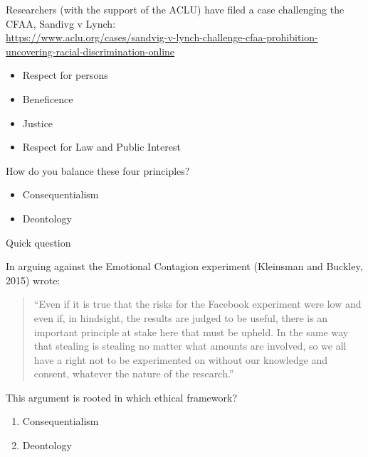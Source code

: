 \documentclass{beamer}
\def\vf{\vfill}
\begin{document}
\begin{frame}

Researchers (with the support of the ACLU) have filed a case challenging the CFAA, Sandivg v Lynch:\\
\tiny{\textcolor{blue}{\url{https://www.aclu.org/cases/sandvig-v-lynch-challenge-cfaa-prohibition-uncovering-racial-discrimination-online}}}

\end{frame}
\begin{frame}

\begin{itemize}
\item Respect for persons
\item Beneficence
\item Justice
\item Respect for Law and Public Interest
\end{itemize}

\vf
How do you balance these four principles?

\end{frame}
\begin{frame}

\begin{itemize}
\item Consequentialism
\item Deontology
\end{itemize}

\end{frame}
\begin{frame} {Quick question}

In arguing against the Emotional Contagion experiment (Kleinsman and Buckley, 2015) wrote:
\begin{quote}
``Even if it is true that the risks for the Facebook experiment were low and even if, in hindsight, the results are judged to be useful, there is an important principle at stake here that must be upheld.  In the same way that stealing is stealing no matter what amounts are involved, so we all have a right not to be experimented on without our knowledge and consent, whatever the nature of the research.'' 
\end{quote}
This argument is rooted in which ethical framework?
\begin{enumerate}
\item Consequentialism
\item Deontology
\end{enumerate}

\end{frame}
\end{document}
